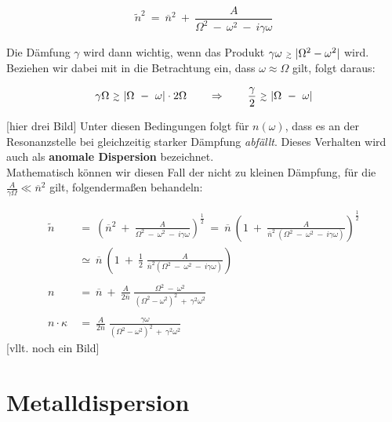 \begin{equation*}
\tilde{n}^2  \ = \  \overline{n}^2 \ + \ \frac{A}{\Omega^2 \ - \ \omega^2 \ - \ i\gamma\omega}
\end{equation*}

Die Dämfung $\gamma$ wird dann wichtig, wenn das Produkt $\gamma\omega \ \mathsmaller{\mathsmaller{\gtrsim}} \ |\Omega^2 - \omega^2|$ wird. Beziehen wir dabei mit in die Betrachtung ein, dass $\omega\approx\Omega$ gilt, folgt daraus:

\begin{equation*}
\gamma\Omega \ \mathsmaller{\mathsmaller{\gtrsim}} \ |\Omega \ - \ \omega| \cdot 2\Omega \qquad \Rightarrow \qquad \frac{\gamma}{2} \ \mathsmaller{\mathsmaller{\gtrsim}} \ |\Omega \ - \ \omega|
\end{equation*}

[hier drei Bild]
Unter diesen Bedingungen folgt für $n(\omega)$, dass es an der Resonanzstelle bei gleichzeitig starker Dämpfung \emph{abfällt}. Dieses Verhalten wird auch als \textbf{anomale Dispersion} bezeichnet.\\
Mathematisch können wir diesen Fall der nicht zu kleinen Dämpfung, für die $\frac{A}{\gamma\Omega}\ll \overline{n}^2$ gilt, folgendermaßen behandeln:

\begin{align*}
\tilde{n} \ &= \ \left(\overline{n}^2 \ + \ \frac{A}{\Omega^2 \ - \ \omega^2 \ - \ i \gamma\omega}\right)^{\frac{1}{2}}  \ = \  \overline{n} \  \left( 1 \ + \ \frac{A}{\overline{n}^2 \ \left(\Omega^2 \ - \ \omega^2 \ - \ i \gamma \omega\right)}\right)^{\frac{1}{2}}\\
&\simeq \ \overline{n} \ \left(1 \ + \ \frac{1}{2}\;\frac{A}{\overline{n}^2\left(\Omega^2 \ - \ \omega^2 \ - \ i \gamma\omega\right)}\right)\\
\ \\
n  \ &= \ \overline{n} \ + \ \frac{A}{2\overline{n}} \; \frac{\Omega^2 \ - \ \omega^2}{\left(\Omega^2-\omega^2\right)^2 \ + \ \gamma^2\omega^2}\\
\ \\
n \cdot \kappa  \ &= \ \frac{A}{2\overline{n}} \; \frac{\gamma\omega}{\left(\Omega^2-\omega^2\right)^2 \ + \ \gamma^2\omega^2} 
\end{align*}
[vllt. noch ein Bild]

\section{Metalldispersion}

